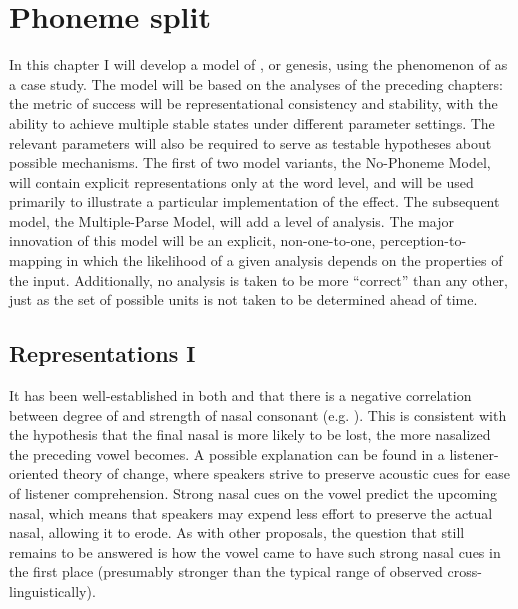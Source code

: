 \chapter{Phoneme split}\label{ch:Phoneme-Split}

In this chapter I will develop a model of , or genesis,
using the phenomenon of  as a case study. The model
will be based on the analyses of the preceding chapters: the metric
of success will be representational consistency and stability, with
the ability to achieve multiple stable states under different parameter
settings. The relevant parameters will also be required to serve as
testable hypotheses about possible  mechanisms. The first
of two model variants, the No-Phoneme Model, will contain explicit
representations only at the word level, and will be used primarily
to illustrate a particular implementation of the  effect.
The subsequent model, the Multiple-Parse Model, will add a 
level of analysis. The major innovation of this model will be an explicit,
non-one-to-one, perception-to- mapping in which the likelihood
of a given analysis depends on the  properties of the input.
Additionally, no analysis is taken to be more ``correct'' than any other,
just as the set of possible  units is not taken to be determined
ahead of time.

\section{Representations I}\largerpage
It has been well-established in both  and  that
there is a negative correlation between degree of  and strength
of nasal consonant (e.g. \citealt{kawasaki1978perceived,cohn1990phonetic}).
This is consistent with the hypothesis that the final nasal is more
likely to be lost, the more nasalized the preceding vowel becomes.
A possible explanation can be found in a listener-oriented theory
of change, where speakers strive to preserve acoustic cues for ease
of listener comprehension. Strong nasal cues on the vowel predict
the upcoming nasal, which means that speakers may expend less effort
to preserve the actual nasal, allowing it to erode. As with other
proposals, the question that still remains to be answered is how the
vowel came to have such strong nasal cues in the first place (presumably
stronger than the typical range of   observed
cross-linguistically). 

